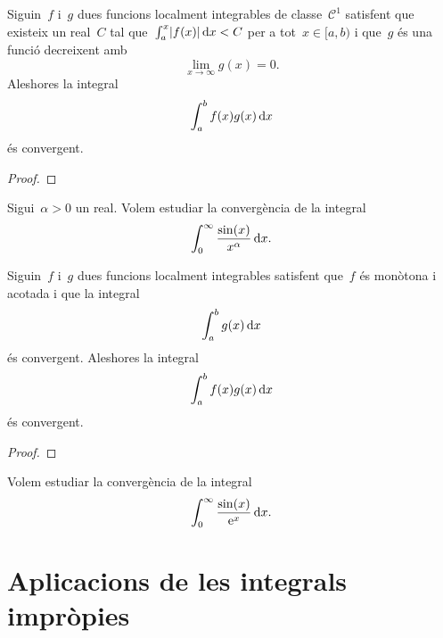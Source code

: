 \documentclass[../../Main.tex]{subfiles}
\begin{document}
	\begin{theorem}
		\label{thm:criteri de Dirichlet per integrals impròpies}
		Siguin~\(f\) i~\(g\) dues funcions localment integrables de classe~\(\mathcal{C}^{1}\) satisfent que existeix un real~\(C\) tal que~\(\int_{a}^{x}\abs{f(x)}\diff x<C\) per a tot~\(x\in[a,b)\) i que~\(g\) és una funció decreixent amb
		\[
		    \lim_{x\to\infty}g(x)=0.
		\]
		Aleshores la integral
		\[
		    \int_{a}^{b}f(x)g(x)\mathop{}\!\mathrm{d} x
		\]
		és convergent.
		\begin{proof}
		\end{proof}
	\end{theorem}
	\begin{example}
		Sigui~\(\alpha>0\) un real.
		Volem estudiar la convergència de la integral
		\[
		    \int_{0}^{\infty}\frac{\sin(x)}{x^{\alpha}}\mathop{}\!\mathrm{d} x.
		\]
		\begin{solution}
		\end{solution}
	\end{example}
	\begin{theorem}
		\label{thm:criteri d'Abel per integrals impròpies}
		Siguin~\(f\) i~\(g\) dues funcions localment integrables satisfent que~\(f\) és monòtona i acotada i que la integral
		\[
		    \int_{a}^{b}g(x)\mathop{}\!\mathrm{d} x
		\]
		és convergent.
		Aleshores la integral
		\[
		    \int_{a}^{b}f(x)g(x)\mathop{}\!\mathrm{d} x
		\]
		és convergent.
		\begin{proof}
		\end{proof}
	\end{theorem}
	\begin{example}
		\label{ex:criteri d'Abel per integrals impròpies}
		Volem estudiar la convergència de la integral
		\[
		    \int_{0}^{\infty}\frac{\sin(x)}{\mathrm{e}^{x}}\mathop{}\!\mathrm{d} x.
		\]
		\begin{solution}
		\end{solution}
	\end{example}
\section{Aplicacions de les integrals impròpies}
\end{document}
